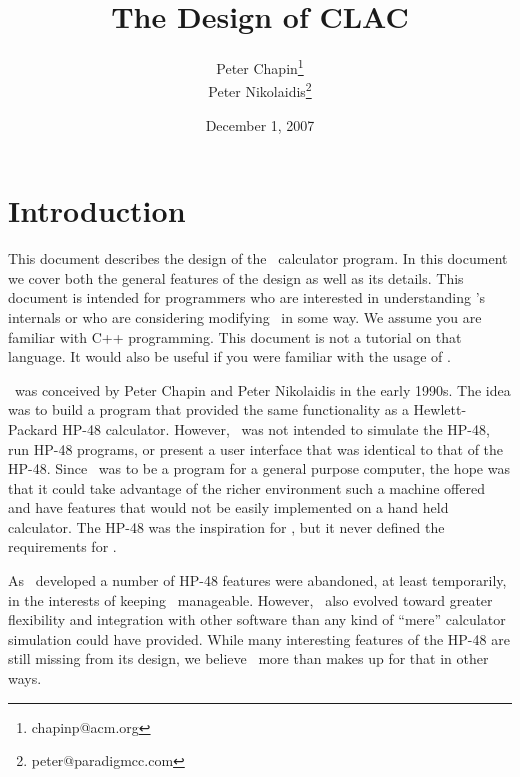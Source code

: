 \documentclass{report}
\begin{document}
\title{The Design of CLAC}
\author{Peter Chapin\thanks{chapinp@acm.org}\\
        Peter Nikolaidis\thanks{peter@paradigmcc.com}}
\date{December 1, 2007}
\maketitle

\tableofcontents
\newpage
{}

\chapter{Introduction}

This document describes the design of the \CLAC\ calculator program. In this document we cover
both the general features of the design as well as its details. This document is intended for
programmers who are interested in understanding \CLAC's internals or who are considering
modifying \CLAC\ in some way. We assume you are familiar with C++ programming. This document is
not a tutorial on that language. It would also be useful if you were familiar with the usage of
\CLAC.

\CLAC\ was conceived by Peter Chapin and Peter Nikolaidis in the early 1990s. The idea was to
build a program that provided the same functionality as a Hewlett-Packard HP-48 calculator.
However, \CLAC\ was not intended to simulate the HP-48, run HP-48 programs, or present a user
interface that was identical to that of the HP-48. Since \CLAC\ was to be a program for a
general purpose computer, the hope was that it could take advantage of the richer environment
such a machine offered and have features that would not be easily implemented on a hand held
calculator. The HP-48 was the inspiration for \CLAC, but it never defined the requirements for
\CLAC.

As \CLAC\ developed a number of HP-48 features were abandoned, at least temporarily, in the
interests of keeping \CLAC\ manageable. However, \CLAC\ also evolved toward greater flexibility
and integration with other software than any kind of ``mere'' calculator simulation could have
provided. While many interesting features of the HP-48 are still missing from its design, we
believe \CLAC\ more than makes up for that in other ways.
\end{document}
